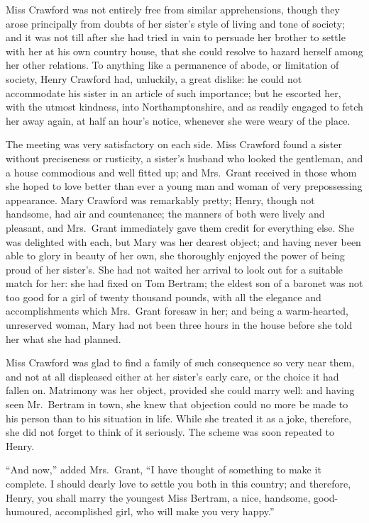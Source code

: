 Miss Crawford was not entirely free from similar
apprehensions, though they arose principally from doubts
of her sister's style of living and tone of society;
and it was not till after she had tried in vain to persuade
her brother to settle with her at his own country house,
that she could resolve to hazard herself among her
other relations.  To anything like a permanence of abode,
or limitation of society, Henry Crawford had, unluckily,
a great dislike:  he could not accommodate his sister
in an article of such importance; but he escorted her,
with the utmost kindness, into Northamptonshire,
and as readily engaged to fetch her away again, at half
an hour's notice, whenever she were weary of the place.

The meeting was very satisfactory on each side.
Miss Crawford found a sister without preciseness
or rusticity, a sister's husband who looked the gentleman,
and a house commodious and well fitted up; and Mrs.\ Grant
received in those whom she hoped to love better than ever
a young man and woman of very prepossessing appearance.
Mary Crawford was remarkably pretty; Henry, though not handsome,
had air and countenance; the manners of both were lively
and pleasant, and Mrs.\ Grant immediately gave them credit
for everything else.  She was delighted with each,
but Mary was her dearest object; and having never been
able to glory in beauty of her own, she thoroughly enjoyed
the power of being proud of her sister's. She had not waited
her arrival to look out for a suitable match for her:
she had fixed on Tom Bertram; the eldest son of a baronet
was not too good for a girl of twenty thousand pounds,
with all the elegance and accomplishments which Mrs.\ Grant
foresaw in her; and being a warm-hearted, unreserved woman,
Mary had not been three hours in the house before she
told her what she had planned.

Miss Crawford was glad to find a family of such consequence
so very near them, and not at all displeased either at
her sister's early care, or the choice it had fallen on.
Matrimony was her object, provided she could marry well:
and having seen Mr.\ Bertram in town, she knew that
objection could no more be made to his person than to
his situation in life.  While she treated it as a joke,
therefore, she did not forget to think of it seriously.
The scheme was soon repeated to Henry.

``And now,'' added Mrs.\ Grant, ``I have thought of something
to make it complete.  I should dearly love to settle you
both in this country; and therefore, Henry, you shall
marry the youngest Miss Bertram, a nice, handsome,
good-humoured, accomplished girl, who will make you very happy.''

